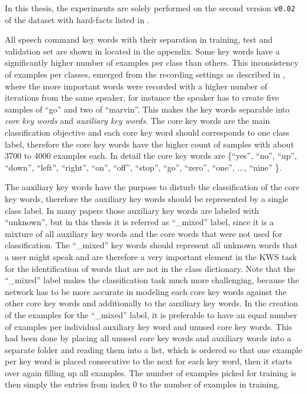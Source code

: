 In this thesis, the experiments are solely performed on the second version \texttt{v0.02} of the dataset with hard-facts listed in .

All speech command key words with their separation in training, test and validation set are shown in  located in the appendix.
Some key words have a significantly higher number of examples per class than others.
This inconsistency of examples per classes, emerged from the recording settings as described in \cite{Warden2018}, where the more important words were recorded with a higher number of iterations from the same speaker, for instance the speaker has to create five samples of \enquote{go} and two of \enquote{marvin}.
This makes the key words separable into \emph{core key words} and \emph{auxiliary key words}.
The core key words are the main classification objective and each core key word should corresponds to one class label, therefore the core key words have the higher count of samples with about 3700 to 4000 examples each.
In detail the core key words are \{\enquote{yes}, \enquote{no}, \enquote{up}, \enquote{down}, \enquote{left}, \enquote{right}, \enquote{on}, \enquote{off}, \enquote{stop}, \enquote{go}, \enquote{zero}, \enquote{one}, ..., \enquote{nine} \}.

The auxiliary key words have the purpose to disturb the classification of the core key words, therefore the auxiliary key words should be represented by a single class label.
In many papers those auxiliary key words are labeled with \enquote{unknown}, but in this thesis it is referred as \enquote{\_mixed} label, since it is a mixture of all auxiliary key words and the core words that were not used for classification.
The \enquote{\_mixed} key words should represent all unknown words that a user might speak and are therefore a very important element in the KWS task for the identification of words that are not in the class dictionary.
Note that the \enquote{\_mixed} label makes the classification task much more challenging, because the network has to be more accurate in modeling each core key words against the other core key words and additionally to the auxiliary key words.
In the creation of the examples for the \enquote{\_mixed} label, it is preferable to have an equal number of examples per individual auxiliary key word and unused core key words.
This had been done by placing all unused core key words and auxiliary words into a separate folder and reading them into a list, which is ordered so that one example per key word is placed consecutive to the next for each key word, then it starts over again filling up all examples.
The number of examples picked for training is then simply the entries from index 0 to the number of examples in training. 

